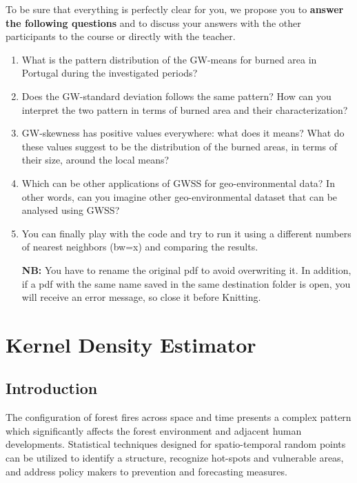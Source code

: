 \documentclass[
]{book}
\begin{document}
To be sure that everything is perfectly clear for you, we propose you to \textbf{answer the following questions} and to discuss your answers with the other participants to the course or directly with the teacher.

\begin{enumerate}
\def\labelenumi{\arabic{enumi})}
\item
  What is the pattern distribution of the GW-means for burned area in Portugal during the investigated periods?
\item
  Does the GW-standard deviation follows the same pattern?
  How can you interpret the two pattern in terms of burned area and their characterization?
\item
  GW-skewness has positive values everywhere: what does it means?
  What do these values suggest to be the distribution of the burned areas, in terms of their size, around the local means?
\item
  Which can be other applications of GWSS for geo-environmental data?
  In other words, can you imagine other geo-environmental dataset that can be analysed using GWSS?
\item
  You can finally play with the code and try to run it using a different numbers of nearest neighbors (bw=x) and comparing the results.

  \textbf{NB:} You have to rename the original pdf to avoid overwriting it.
  In addition, if a pdf with the same name saved in the same destination folder is open, you will receive an error message, so close it before Knitting.
\end{enumerate}

\hypertarget{kernel-density-estimator}{%
\chapter{Kernel Density Estimator}\label{kernel-density-estimator}}

\hypertarget{introduction-1}{%
\section{Introduction}\label{introduction-1}}

The configuration of forest fires across space and time presents a complex pattern which significantly affects the forest environment and adjacent human developments.
Statistical techniques designed for spatio-temporal random points can be utilized to identify a structure, recognize hot-spots and vulnerable areas, and address policy makers to prevention and forecasting measures.
\end{document}
